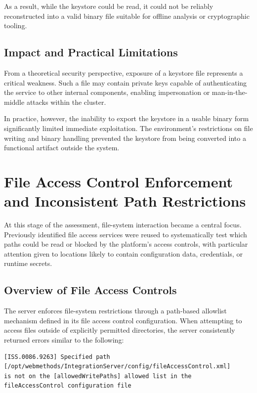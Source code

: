 \documentclass[12pt,a4paper]{report}
\begin{document}
As a result, while the keystore could be read, it could not be reliably reconstructed into a valid binary file suitable for offline analysis or cryptographic tooling.

\subsection{Impact and Practical Limitations}

From a theoretical security perspective, exposure of a keystore file represents a critical weakness. Such a file may contain private keys capable of authenticating the service to other internal components, enabling impersonation or man-in-the-middle attacks within the cluster.

In practice, however, the inability to export the keystore in a usable binary form significantly limited immediate exploitation. The environment’s restrictions on file writing and binary handling prevented the keystore from being converted into a functional artifact outside the system.

\clearpage
\section{File Access Control Enforcement and Inconsistent Path Restrictions}

At this stage of the assessment, file-system interaction became a central focus. Previously identified file access services were reused to systematically test which paths could be read or blocked by the platform’s access controls, with particular attention given to locations likely to contain configuration data, credentials, or runtime secrets.


\subsection{Overview of File Access Controls}

The server enforces file-system restrictions through a path-based allowlist mechanism defined in its file access control configuration. When attempting to access files outside of explicitly permitted directories, the server consistently returned errors similar to the following:

\begin{verbatim}
[ISS.0086.9263] Specified path
[/opt/webmethods/IntegrationServer/config/fileAccessControl.xml]
is not on the [allowedWritePaths] allowed list in the
fileAccessControl configuration file
\end{verbatim}
\end{document}
